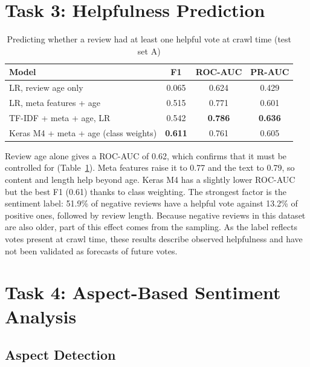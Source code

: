 \section{Task 3: Helpfulness Prediction}

\begin{table}[!htbp]
\centering
\caption{Predicting whether a review had at least one helpful vote at crawl time (test set A)}
\label{tab:helpful}
\begin{tabular}{lccc}
\toprule
\textbf{Model} & \textbf{F1} & \textbf{ROC-AUC} & \textbf{PR-AUC} \\
\midrule
LR, review age only & 0.065 & 0.624 & 0.429 \\
LR, meta features + age & 0.515 & 0.771 & 0.601 \\
TF-IDF + meta + age, LR & 0.542 & \textbf{0.786} & \textbf{0.636} \\
Keras M4 + meta + age (class weights) & \textbf{0.611} & 0.761 & 0.605 \\
\bottomrule
\end{tabular}
\end{table}

Review age alone gives a ROC-AUC of 0.62, which confirms that it must be controlled for (Table~\ref{tab:helpful}). Meta features raise it to 0.77 and the text to 0.79, so content and length help beyond age. Keras M4 has a slightly lower ROC-AUC but the best F1 (0.61) thanks to class weighting. The strongest factor is the sentiment label: 51.9\% of negative reviews have a helpful vote against 13.2\% of positive ones, followed by review length. Because negative reviews in this dataset are also older, part of this effect comes from the sampling. As the label reflects votes present at crawl time, these results describe observed helpfulness and have not been validated as forecasts of future votes.

\section{Task 4: Aspect-Based Sentiment Analysis}

\subsection{Aspect Detection}


